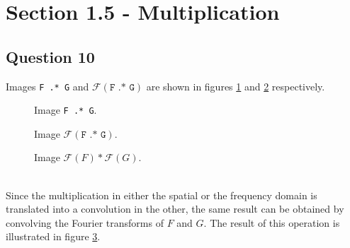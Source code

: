 \section{Section 1.5 - Multiplication}

\subsection{Question 10}

Images \texttt{F .* G} and $\mathcal{F}(\texttt{F .* G})$ are shown in figures \ref{fig:Q10_1} and \ref{fig:Q10_2} respectively.

\begin{minipage}{\linewidth}
  \centering
  \begin{minipage}{0.25\linewidth}
    \begin{figure}[H]
      \scalebox{0.4}{}
      \caption{Image \texttt{F .* G}.}
      \label{fig:Q10_1}
    \end{figure}
  \end{minipage}
  \hspace{0.05\linewidth}
  \begin{minipage}{0.25\linewidth}
    \begin{figure}[H]
      \scalebox{0.4}{}
      \caption{Image $\mathcal{F}(\texttt{F .* G})$.}
      \label{fig:Q10_2}
    \end{figure}
  \end{minipage}
    \hspace{0.05\linewidth}
  \begin{minipage}{0.25\linewidth}
    \begin{figure}[H]
      \scalebox{0.4}{}
      \caption{Image $\mathcal{F}(F) * \mathcal{F}(G)$.}
      \label{fig:Q10_3}
    \end{figure}
  \end{minipage}
\end{minipage}
\\

Since the multiplication in either the spatial or the frequency domain is translated into a convolution in the other, 
the same result can be obtained by convolving the Fourier transforms of $F$ and $G$. The result of this operation is
illustrated in figure \ref{fig:Q10_3}.